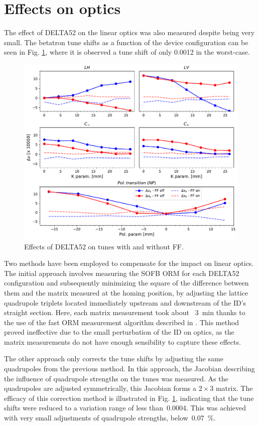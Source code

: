 \documentclass[a4paper,
               keeplastbox,   %
               ]{jacow}
\begin{document}
\section{Effects on optics}

The effect of DELTA52 on the linear optics was also measured despite being very small. The betatron tune shifts as a function of the device configuration can be seen in Fig. \ref{fig:tunes}, where it is observed a tune shift of only 0.0012 in the worst-case.

\begin{figure}[]
    \centering
   \includegraphics[width=0.9\columnwidth]{THPS18_f4.pdf}
   \caption{Effects of DELTA52 on tunes with and without FF.}
   \label{fig:tunes}
\end{figure}

Two methods have been employed to compensate for the impact on linear optics. The initial approach involves measuring the SOFB ORM for each DELTA52 configuration and subsequently minimizing the square of the difference between them and the matrix measured at the homing position, by adjusting the lattice quadrupole triplets located immediately upstream and downstream of the ID's straight section. Here, each matrix measurement took about ~\SI{3}{\minute} thanks to the use of the fast ORM measurement algorithm described in \cite{Velloso:IPAC22-MOPOTK002}. This method proved ineffective due to the small perturbation of the ID on optics, as the matrix measurements do not have enough sensibility to capture these effects.

The other approach only corrects the tune shifts by adjusting the same quadrupoles from the previous method. In this approach, the Jacobian describing the influence of quadrupole strengths on the tunes was measured. As the quadrupoles are adjusted symmetrically, this Jacobian forms a $2 \times 3$ matrix. The efficacy of this correction method is illustrated in Fig. \ref{fig:tunes}, indicating that the tune shifts were reduced to a variation range of less than~\num{0.0004}. This was achieved with very small adjustments of quadrupole strengths, below~\SI{0.07}{\percent}.
\end{document}
